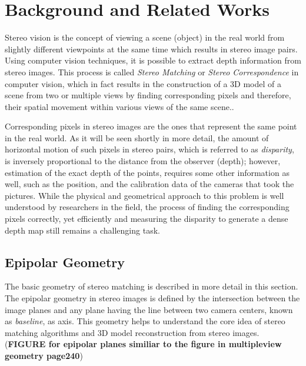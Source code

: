 \documentclass[dvips,letterpaper,12pt]{report}
\begin{document}
\chapter{Background and Related Works}
Stereo vision is the concept of viewing a scene (object) in the real world from slightly different
viewpoints at the same time which results in stereo image
pairs. Using computer vision techniques, it is possible to extract depth information from stereo
images. This process is called {\it Stereo Matching} or {\it Stereo Correspondence} in computer vision,
which in fact results in the construction of a
3D model of a scene from two or multiple views by finding corresponding pixels and therefore, their spatial movement within various views of the same scene.\cite{sze11}.

Corresponding pixels in stereo images are the ones that represent the same point in the real
world. As it will be seen shortly in more detail, the amount of horizontal motion of such pixels
in stereo pairs, which is referred to as {\it disparity}, is inversely proportional to the
distance from the observer (depth); however,  estimation of the exact depth of the points, requires some
other information as well, such as the position, and the calibration data of the cameras that took the pictures.
While the physical and geometrical approach to this problem is well understood by researchers in the field, the process of finding the corresponding pixels correctly, yet efficiently
and measuring the disparity to generate a dense depth map still remains a challenging task. \newline

\section{Epipolar Geometry}
The basic geometry of stereo matching is described in more detail in this section. 
The epipolar geometry in stereo images is defined by the intersection between the image planes and any plane having the line between two camera centers, known as {\it baseline}, as axis. 
This geometry helps to understand the core idea of stereo matching algorithms and 3D model reconstruction from stereo images.
(\textbf {FIGURE  for epipolar planes similiar to the figure in multipleview geometry page240})
\end{document}
